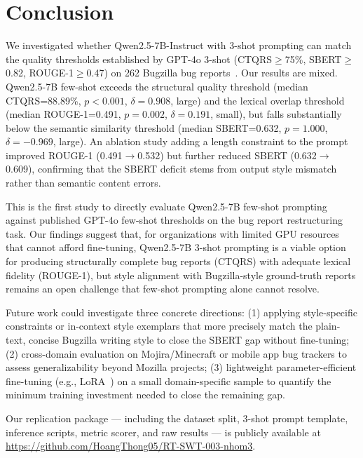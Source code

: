 
\section{Conclusion}
\label{sec:conclusion}

We investigated whether Qwen2.5-7B-Instruct with 3-shot prompting
can match the quality thresholds established by GPT-4o 3-shot
(CTQRS$\geq$75\%, SBERT$\geq$0.82, ROUGE-1$\geq$0.47)
on 262 Bugzilla bug reports~\cite{acharya2025bugquality}.
Our results are mixed. Qwen2.5-7B few-shot exceeds the
structural quality threshold (median CTQRS=88.89\%,
$p<0.001$, $\delta=0.908$, large) and the lexical overlap
threshold (median ROUGE-1=0.491, $p=0.002$, $\delta=0.191$,
small), but falls substantially below the semantic
similarity threshold (median SBERT=0.632, $p=1.000$,
$\delta=-0.969$, large). An ablation study adding a
length constraint to the prompt improved ROUGE-1
(0.491$\rightarrow$0.532) but further reduced SBERT
(0.632$\rightarrow$0.609), confirming that the SBERT
deficit stems from output style mismatch rather than
semantic content errors.

This is the first study to directly evaluate Qwen2.5-7B
few-shot prompting against published GPT-4o few-shot thresholds
on the bug report restructuring task. Our findings suggest
that, for organizations with limited GPU resources that
cannot afford fine-tuning, Qwen2.5-7B 3-shot prompting is
a viable option for producing structurally complete bug reports
(CTQRS) with adequate lexical fidelity (ROUGE-1), but style
alignment with Bugzilla-style ground-truth reports remains
an open challenge that few-shot prompting alone cannot resolve.

Future work could investigate three concrete directions:
(1) applying style-specific constraints or in-context style
exemplars that more precisely match the plain-text, concise
Bugzilla writing style to close the SBERT gap without
fine-tuning;
(2) cross-domain evaluation on Mojira/Minecraft or mobile
app bug trackers to assess generalizability beyond Mozilla
projects;
(3) lightweight parameter-efficient fine-tuning (e.g.,
LoRA~\cite{acharya2025bugquality}) on a small domain-specific
sample to quantify the minimum training investment needed
to close the remaining gap.

Our replication package --- including the dataset split,
3-shot prompt template, inference scripts, metric scorer,
and raw results --- is publicly available at
\url{https://github.com/HoangThong05/RT-SWT-003-nhom3}.
